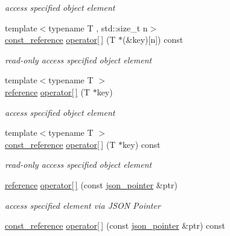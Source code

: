 \begin{DoxyCompactItemize}
\begin{DoxyCompactList}\small\item\em access specified object element \end{DoxyCompactList}\item 
{\footnotesize template$<$typename T , std\-::size\-\_\-t n$>$ }\\\hyperlink{classnlohmann_1_1basic__json_af677a29b0e66edc9f66e5167e4667071}{const\-\_\-reference} \hyperlink{classnlohmann_1_1basic__json_ad9cd312208273fb3fb2adf1f6d8d34ae}{operator\mbox{[}$\,$\mbox{]}} (T $\ast$(\&key)\mbox{[}n\mbox{]}) const 
\begin{DoxyCompactList}\small\item\em read-\/only access specified object element \end{DoxyCompactList}\item 
{\footnotesize template$<$typename T $>$ }\\\hyperlink{classnlohmann_1_1basic__json_a3ec8e17be8732fe436e9d6733f52b7a3}{reference} \hyperlink{classnlohmann_1_1basic__json_ac7c006e2345a76859c4802db7d130e0e}{operator\mbox{[}$\,$\mbox{]}} (T $\ast$key)
\begin{DoxyCompactList}\small\item\em access specified object element \end{DoxyCompactList}\item 
{\footnotesize template$<$typename T $>$ }\\\hyperlink{classnlohmann_1_1basic__json_af677a29b0e66edc9f66e5167e4667071}{const\-\_\-reference} \hyperlink{classnlohmann_1_1basic__json_aa6fd72df1ce9f80e61012784c598456e}{operator\mbox{[}$\,$\mbox{]}} (T $\ast$key) const 
\begin{DoxyCompactList}\small\item\em read-\/only access specified object element \end{DoxyCompactList}\item 
\hyperlink{classnlohmann_1_1basic__json_a3ec8e17be8732fe436e9d6733f52b7a3}{reference} \hyperlink{classnlohmann_1_1basic__json_a7605b20debcc12fc44bd9f2075122a87}{operator\mbox{[}$\,$\mbox{]}} (const \hyperlink{classnlohmann_1_1basic__json_1_1json__pointer}{json\-\_\-pointer} \&ptr)
\begin{DoxyCompactList}\small\item\em access specified element via J\-S\-O\-N Pointer \end{DoxyCompactList}\item 
\hyperlink{classnlohmann_1_1basic__json_af677a29b0e66edc9f66e5167e4667071}{const\-\_\-reference} \hyperlink{classnlohmann_1_1basic__json_a76347b37f07c75049f5164053a6cf81a}{operator\mbox{[}$\,$\mbox{]}} (const \hyperlink{classnlohmann_1_1basic__json_1_1json__pointer}{json\-\_\-pointer} \&ptr) const 

\end{DoxyCompactItemize}
